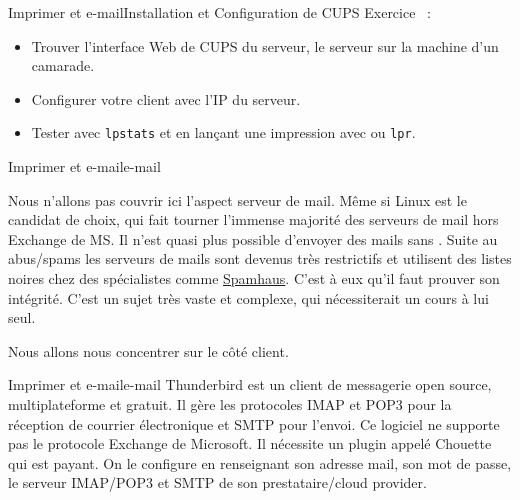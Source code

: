 \documentclass{beamer}
\begin{document}
    \begin{frame}{Imprimer et e-mail}{Installation et Configuration de CUPS}
        Exercice \execcounterdispinc~:
        \begin{itemize}
            \item Trouver l'interface Web de CUPS du serveur, le serveur sur la machine d'un camarade.
            \item Configurer votre client avec l'IP du serveur.
            \item Tester avec \lstinline{lpstats} et en lançant une impression avec ou \lstinline{lpr}.
        \end{itemize}
    \end{frame}

    \begin{frame}{Imprimer et e-mail}{e-mail}
        \begin{dangercolorbox}
            Nous n'allons pas couvrir ici l'aspect serveur de mail. Même si Linux est le candidat de choix, qui fait tourner l'immense majorité des serveurs de mail hors Exchange de MS.
            \bigbreak
            Il n'est quasi plus possible d'envoyer des mails sans .
            Suite au abus/spams les serveurs de mails sont devenus très restrictifs et utilisent des listes noires chez des spécialistes comme \href{https://www.spamhaus.org/}{Spamhaus}.
            C'est à eux qu'il faut prouver son intégrité.
            \bigbreak
            C'est un sujet très vaste et complexe, qui nécessiterait un cours à lui seul.
        \end{dangercolorbox}
        Nous allons nous concentrer sur le côté client.
    \end{frame}

    \begin{frame}{Imprimer et e-mail}{e-mail}
        Thunderbird est un client de messagerie open source, multiplateforme et gratuit.
        Il gère les protocoles IMAP et POP3 pour la réception de courrier électronique et SMTP pour l'envoi.
        \bigbreak
        Ce logiciel ne supporte pas le protocole Exchange de Microsoft.
        Il nécessite un plugin appelé Chouette qui est payant.
        \bigbreak
        On le configure en renseignant son adresse mail, son mot de passe, le serveur IMAP/POP3 et SMTP de son prestataire/cloud provider.
    \end{frame}
\end{document}
